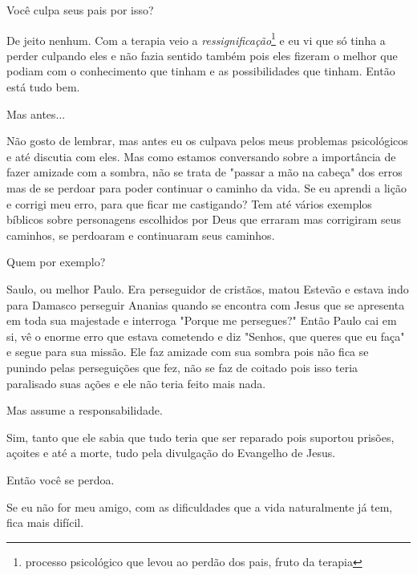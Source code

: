 \emdash{}Você culpa seus pais por isso?

\emdash{}De jeito nenhum. Com a terapia veio a \textit{ressignificação}\footnote{processo psicológico que levou ao perdão dos pais, fruto da terapia} e eu vi que só tinha a perder culpando eles e não fazia sentido também pois eles fizeram o melhor que podiam com o conhecimento que tinham e as possibilidades que tinham. Então está tudo bem.

\emdash{}Mas antes...

\emdash{}Não gosto de lembrar, mas antes eu os culpava pelos meus problemas psicológicos e até discutia com eles. Mas como estamos conversando sobre a importância de fazer amizade com a sombra, não se trata de "passar a mão na cabeça" dos erros mas de se perdoar para poder continuar o caminho da vida. Se eu aprendi a lição e corrigi meu erro, para que ficar me castigando? Tem até vários exemplos bíblicos sobre personagens escolhidos por Deus que erraram mas corrigiram seus caminhos, se perdoaram e continuaram seus caminhos.

\emdash{}Quem por exemplo?

\emdash{}Saulo, ou melhor Paulo. Era perseguidor de cristãos, matou Estevão e estava indo para Damasco perseguir Ananias quando se encontra com Jesus que se apresenta em toda sua majestade e interroga "Porque me persegues?" Então Paulo cai em si, vê o enorme erro que estava cometendo e diz "Senhos, que queres que eu faça" e segue para sua missão. Ele faz amizade com sua sombra pois não fica se punindo pelas perseguições que fez, não se faz de coitado pois isso teria paralisado suas ações e ele não teria feito mais nada.

\emdash{}Mas assume a responsabilidade.

\emdash{}Sim, tanto que ele sabia que tudo teria que ser reparado pois suportou prisões, açoites e até a morte, tudo pela divulgação do Evangelho de Jesus. 

\emdash{}Então você se perdoa.

\emdash{}Se eu não for meu amigo, com as dificuldades que a vida naturalmente já tem, fica mais difícil.